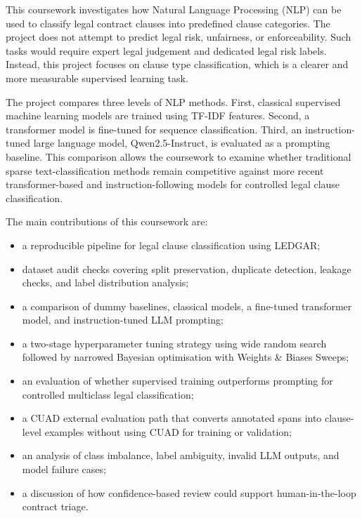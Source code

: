 \documentclass[11pt]{article}
\begin{document}
This coursework investigates how Natural Language Processing (NLP) can be used to classify legal contract clauses into predefined clause categories. The project does not attempt to predict legal risk, unfairness, or enforceability. Such tasks would require expert legal judgement and dedicated legal risk labels. Instead, this project focuses on clause type classification, which is a clearer and more measurable supervised learning task.

The project compares three levels of NLP methods. First, classical supervised machine learning models are trained using TF-IDF features. Second, a transformer model is fine-tuned for sequence classification. Third, an instruction-tuned large language model, Qwen2.5-Instruct, is evaluated as a prompting baseline. This comparison allows the coursework to examine whether traditional sparse text-classification methods remain competitive against more recent transformer-based and instruction-following models for controlled legal clause classification.

The main contributions of this coursework are:

\begin{itemize}[leftmargin=*]
    \item a reproducible pipeline for legal clause classification using LEDGAR;
    \item dataset audit checks covering split preservation, duplicate detection, leakage checks, and label distribution analysis;
    \item a comparison of dummy baselines, classical models, a fine-tuned transformer model, and instruction-tuned LLM prompting;
    \item a two-stage hyperparameter tuning strategy using wide random search followed by narrowed Bayesian optimisation with Weights \& Biases Sweeps;
    \item an evaluation of whether supervised training outperforms prompting for controlled multiclass legal classification;
    \item a CUAD external evaluation path that converts annotated spans into clause-level examples without using CUAD for training or validation;
    \item an analysis of class imbalance, label ambiguity, invalid LLM outputs, and model failure cases;
    \item a discussion of how confidence-based review could support human-in-the-loop contract triage.
\end{itemize}
\end{document}
